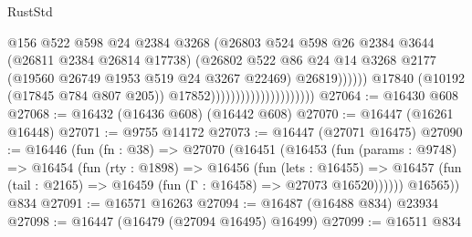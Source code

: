 \begin{lexlean}{RustStd}
\begin{coremodule}
                                                      @156
                                                      @522
                                                      @598
                                                      @24
                                                      @2384
                                                      @3268
                                                      (@26803
                                                        @524
                                                        @598
                                                        @26
                                                        @2384
                                                        @3644
                                                        (@26811 @2384 @26814 @17738)
                                                        (@26802
                                                          @522
                                                          @86
                                                          @24
                                                          @14
                                                          @3268
                                                          @2177
                                                          (@19560
                                                            @26749
                                                            @1953
                                                            @519
                                                            @24
                                                            @3267
                                                            @22469)
                                                          @26819))))))
                                              @17840
                                              (@10192 (@17845 @784 @807 @205))
                                              @17852)))))))))))))))))))))
@27064 := @16430 @608
@27068 := @16432 (@16436 @608) (@16442 @608)
@27070 := @16447 (@16261 @16448)
@27071 := @9755 @14172
@27073 := @16447 (@27071 @16475)
@27090 := @16446
    (fun (fn : @38) =>
    @27070
      (@16451
        (@16453
          (fun (params : @9748) =>
          @16454
            (fun (rty : @1898) =>
            @16456
              (fun (lets : @16455) =>
              @16457 (fun (tail : @2165) => @16459 (fun (Γ : @16458) => @27073 @16520))))))
        @16565))
    @834
@27091 := @16571 @16263
@27094 := @16487 (@16488 @834) @23934
@27098 := @16447 (@16479 (@27094 @16495) @16499)
@27099 := @16511 @834

\end{coremodule}
\end{lexlean}
